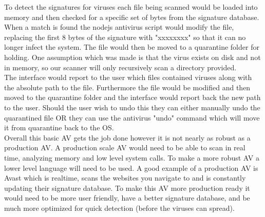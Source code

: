 \documentclass[fleqn, 12pt]{article}
\begin{document}
To detect the signatures for viruses each file being scanned would be loaded into memory and then checked for a specific set of bytes from the signature database. When a match is found the nodejs antivirus script would modify the file, replacing the first 8 bytes of the signature with "xxxxxxxx" so that it can no longer infect the system. The file would then be moved to a quarantine folder for holding. One assumption which was made is that the virus exists on disk and not in memory, so our scanner will only recursively scan a directory provided.\\

The interface would report to the user which files contained viruses along with the absolute path to the file. Furthermore the file would be modified and then moved to the quarantine folder and the interface would report back the new path to the user. Should the user wish to undo this they can either manually undo the quarantined file OR they can use the antivirus "undo" command which will move it from quarantine back to the OS.\\

Overall this basic AV gets the job done however it is not nearly as robust as a production AV. A production scale AV would need to be able to scan in real time, analyzing memory and low level system calls. To make a more robust AV a lower level language will need to be used. A good example of a production AV is Avast which is realtime, scans the websites you navigate to and is constantly updating their signature database. To make this AV more production ready it would need to be more user friendly, have a better signature database, and be much more optimized for quick detection (before the viruses can spread).
\end{document}
